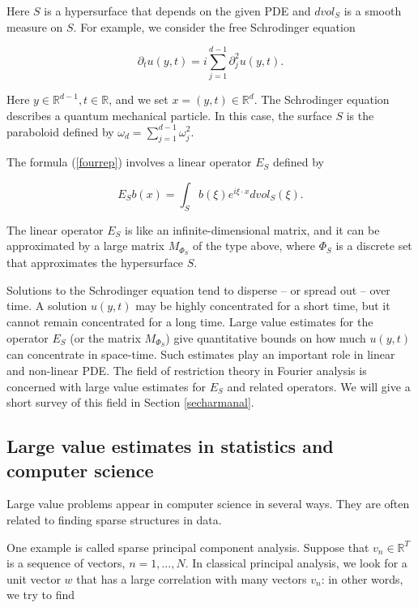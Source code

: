 \documentclass{amsart}
\newcommand{\RR}{\mathbb{R}}
\begin{document}
\noindent Here $S$ is a hypersurface that depends on the given PDE and $d vol_S$ is a smooth measure on $S$.   For example,  we consider the free Schrodinger equation 

$$\partial_t u(y,t) = i \sum_{j=1}^{d-1} \partial_j^2 u(y,t). $$

\noindent Here $y \in \RR^{d-1},  t \in \RR$,  and we set $x = (y,t) \in \RR^d$.   The Schrodinger equation describes a quantum mechanical particle.  
In this case,  the surface $S$ is the paraboloid defined by $\omega_d =  \sum_{j=1}^{d-1} \omega_j^2$.  

The formula (\ref{fourrep}) involves a linear operator $E_S$ defined by

\begin{equation} \label{defEs} E_S b(x)  =  \int_{S} b(\xi) e^{i \xi \cdot x} d vol_S(\xi). \end{equation}

\noindent The linear operator $E_S$ is like an infinite-dimensional matrix,  and it can be approximated by a large matrix $M_{\Phi_S}$ of the type above,  where $\Phi_S$ is a discrete set that approximates the hypersurface $S$.  

Solutions to the Schrodinger equation tend to disperse -- or spread out -- over time.   A solution $u(y,t)$ may be highly concentrated for a short time,  but it cannot remain concentrated for a long time.   Large value estimates for the operator $E_S$ (or the matrix $M_{\Phi_S}$) give quantitative bounds on how much $u(y,t)$ can concentrate in space-time.   Such estimates play an important role in linear and non-linear PDE.  
 The field of restriction theory in Fourier analysis is concerned with large value estimates for $E_S$ and related operators.   We will give a short survey of this field in Section \ref{secharmanal}.


\subsection{Large value estimates in statistics and computer science}

Large value problems appear in computer science in several ways.   They are often related to finding sparse structures in data.

One example is called sparse principal component analysis.  Suppose that $v_n \in \RR^T$ is a sequence of vectors,  $n= 1, ..., N$.   In classical principal analysis,  we look for a unit vector $w$ that has a large correlation with many vectors $v_n$: in other words,  we try to find
\end{document}
